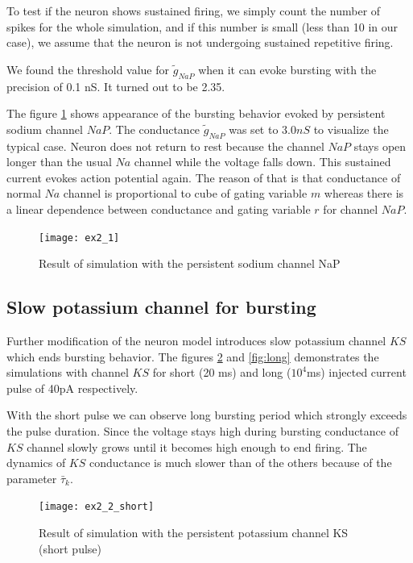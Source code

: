 \documentclass[a4paper,11pt]{article} %
\begin{document}
To test if the neuron shows sustained firing, we simply count
the number of spikes for the whole simulation, and if this number
is small (less than 10 in our case), we assume that the neuron is
not undergoing sustained repetitive firing.

We found the threshold value for $\tilde{g}_{NaP}$ when it can evoke bursting 
with the precision of 0.1 nS. It turned out to be 2.35.

The figure \ref{fig:2.1} shows appearance of the bursting behavior evoked by 
persistent sodium channel $NaP$. The conductance $\tilde{g}_{NaP}$ was
set to $3.0 nS$ to visualize the typical case. Neuron does not return
to rest because the channel $NaP$ stays open longer than the usual $Na$ channel
while the voltage falls down. This sustained current evokes action potential
again. The reason of that is that conductance of normal $Na$ channel is 
proportional to cube of gating variable $m$ whereas there is a linear dependence
between conductance and gating variable $r$ for channel $NaP$.

\begin{figure}[H]
    \centering
    \texttt{[image: ex2\_1]}
    \caption{Result of simulation with the persistent sodium channel NaP}
    \label{fig:2.1}
\end{figure}

\subsection{Slow potassium channel for bursting}

Further modification of the neuron model introduces slow potassium channel $KS$
which ends bursting behavior. The figures \ref{fig:short} and \ref{fig:long}
demonstrates the simulations with channel $KS$ for short (20 ms) and long ($10^4$ms) injected
current pulse of 40pA respectively.

With the short pulse we can observe long bursting period
which strongly exceeds the pulse duration. Since the voltage stays high during bursting
conductance of $KS$ channel slowly grows until it becomes high enough to end firing.
The dynamics of $KS$ conductance is much slower than of the others because of the parameter $\bar{\tau}_k$.

\begin{figure}[H]
    \centering
    \texttt{[image: ex2\_2\_short]}
    \caption{Result of simulation with the persistent potassium channel KS (short pulse)}
    \label{fig:short}
\end{figure}
\end{document}
